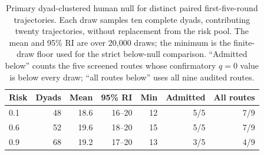 \documentclass[sigconf,anonymous]{aamas}
\begin{document}
\begin{table}[t]
    \caption{Primary dyad-clustered human null for distinct paired
    first-five-round trajectories. Each draw samples ten complete dyads,
    contributing twenty trajectories, without replacement from the risk pool.
    The mean and 95\% RI are over 20{,}000 draws; the minimum is the finite-draw
    floor used for the strict below-null comparison. ``Admitted below'' counts
    the five screened routes whose confirmatory $q{=}0$ value is below every
    draw; ``all routes below'' uses all nine audited routes.}
    \label{tab:diversity-dyad-primary}
    \centering
    \small
    \setlength{\tabcolsep}{4pt}
    \begin{tabular}{@{}lrrrrrr@{}}
        \toprule
        Risk & Dyads & Mean & 95\% RI & Min & Admitted & All routes \\
        \midrule
        0.1 & 48 & 18.6 & 16--20 & 12 & 5/5 & 7/9 \\
        0.6 & 52 & 19.6 & 18--20 & 15 & 5/5 & 7/9 \\
        0.9 & 68 & 19.2 & 17--20 & 13 & 3/5 & 4/9 \\
        \bottomrule
    \end{tabular}
\end{table}
\end{document}
